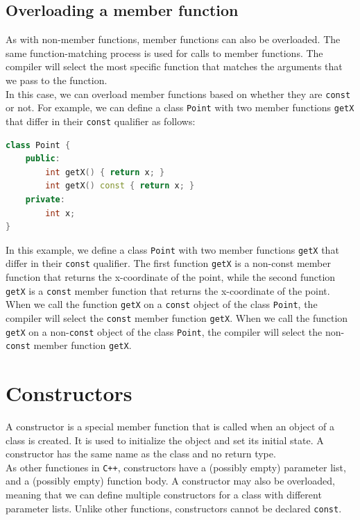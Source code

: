 \subsection{Overloading a member function}

As with non-member functions, member functions can also be overloaded. The same function-matching
process is used for calls to member functions. The compiler will select the most specific
function that matches the arguments that we pass to the function.\\

In this case, we can overload member functions based on whether they are \texttt{const} or not.
For example, we can define a class \texttt{Point} with two member functions \texttt{getX}
that differ in their \texttt{const} qualifier as follows:\\

\begin{lstlisting}[language=C++]
class Point {
    public:
        int getX() { return x; }
        int getX() const { return x; }
    private:
        int x;
}
\end{lstlisting}

In this example, we define a class \texttt{Point} with two member functions \texttt{getX}
that differ in their \texttt{const} qualifier. The first function \texttt{getX} is a
non-const member function that returns the x-coordinate of the point, while the second
function \texttt{getX} is a \texttt{const} member function that returns the x-coordinate
of the point.\\

When we call the function \texttt{getX} on a \texttt{const} object of the class \texttt{Point},
the compiler will select the \texttt{const} member function \texttt{getX}. When we call the
function \texttt{getX} on a non-\texttt{const} object of the class \texttt{Point}, the compiler
will select the non-\texttt{const} member function \texttt{getX}.

\section{Constructors}

A constructor is a special member function that is called when an object of a class is
created. It is used to initialize the object and set its initial state. A constructor
has the same name as the class and no return type.\\

As other functiones in \texttt{C++}, constructors have a (possibly empty) parameter list, and
a (possibly empty) function body. A constructor may also be overloaded, meaning that we can
define multiple constructors for a class with different parameter lists. Unlike other functions,
constructors cannot be declared \texttt{const}.\\

